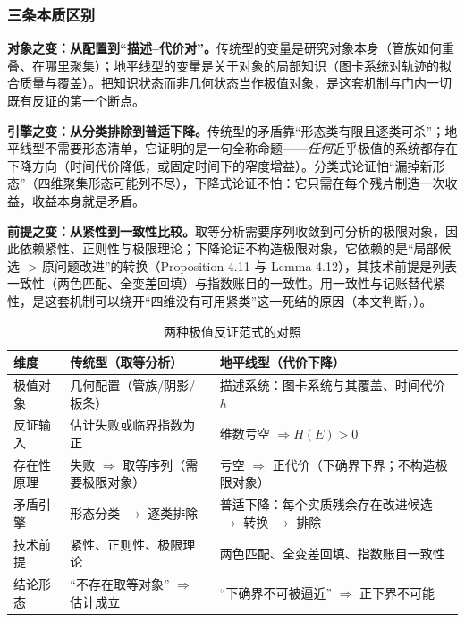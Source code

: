 \subsubsection*{三条本质区别}

\textbf{对象之变：从配置到“描述--代价对”。}传统型的变量是研究对象本身（管族如何重叠、在哪里聚集）；地平线型的变量是关于对象的局部知识（图卡系统对轨迹的拟合质量与覆盖）。把知识状态而非几何状态当作极值对象，是这套机制与门内一切既有反证的第一个断点。

\textbf{引擎之变：从分类排除到普适下降。}传统型的矛盾靠“形态类有限且逐类可杀”；地平线型不需要形态清单，它证明的是一句全称命题——\emph{任何}近乎极值的系统都存在下降方向（时间代价降低，或固定时间下的窄度增益）。分类式论证怕“漏掉新形态”（四维聚集形态可能列不尽），下降式论证不怕：它只需在每个残片制造一次收益，收益本身就是矛盾。

\textbf{前提之变：从紧性到一致性比较。}取等分析需要序列收敛到可分析的极限对象，因此依赖紧性、正则性与极限理论；下降论证不构造极限对象，它依赖的是“局部候选 -> 原问题改进”的转换（Proposition 4.11 与 Lemma 4.12），其技术前提是列表一致性（两色匹配、全变差回填）与指数账目的一致性。用一致性与记账替代紧性，是这套机制可以绕开“四维没有可用紧类”这一死结的原因（本文判断，\cfM）。

\begin{table}[t]
\centering
\caption{两种极值反证范式的对照}
\label{tab:extremal}
\footnotesize
\begin{tabularx}{\textwidth}{@{}L{2.7cm}L{5.3cm}Y@{}}
\toprule
{}\textbf{维度} & \textbf{传统型（取等分析）} & \textbf{地平线型（代价下降）} \\
\midrule
极值对象 & 几何配置（管族/阴影/板条） & 描述系统：图卡系统与其覆盖、时间代价 $h$ \\
反证输入 & 估计失败或临界指数为正 & 维数亏空 $\Rightarrow H(E)>0$ \\
存在性原理 & 失败 $\Rightarrow$ 取等序列（需要极限对象） & 亏空 $\Rightarrow$ 正代价（下确界下界；不构造极限对象） \\
矛盾引擎 & 形态分类 $\to$ 逐类排除 & 普适下降：每个实质残余存在改进候选 $\to$ 转换 $\to$ 排除 \\
技术前提 & 紧性、正则性、极限理论 & 两色匹配、全变差回填、指数账目一致性 \\
结论形态 & “不存在取等对象” $\Rightarrow$ 估计成立 & “下确界不可被逼近” $\Rightarrow$ 正下界不可能 \\
\bottomrule
\end{tabularx}
\end{table}

